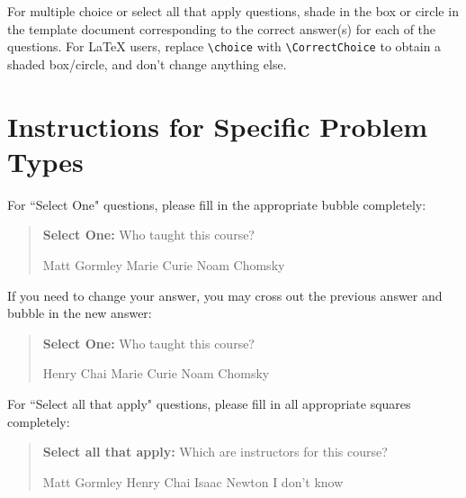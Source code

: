 \documentclass[11pt,addpoints,answers]{exam}
\newcommand{\blackcircle}{\tikz\draw[black,fill=black] (0,0) circle (1ex);}
\begin{document}

For multiple choice or select all that apply questions, shade in the box or circle in the template document corresponding to the correct answer(s) for each of the questions. For \LaTeX{} users, replace \lstinline{\choice} with \lstinline{\CorrectChoice} to obtain a shaded box/circle, and don't change anything else.\clearpage

\section*{Instructions for Specific Problem Types}

For ``Select One" questions, please fill in the appropriate bubble completely:

\begin{quote}
\textbf{Select One:} Who taught this course?
    \begin{checkboxes}
     \CorrectChoice Matt Gormley
     \choice Marie Curie
     \choice Noam Chomsky
    \end{checkboxes}
\end{quote}

If you need to change your answer, you may cross out the previous answer and bubble in the new answer:

\begin{quote}
\textbf{Select One:} Who taught this course?
    {
    \begin{checkboxes}
     \CorrectChoice Henry Chai 
     \choice Marie Curie \checkboxchar{\xcancel{\blackcircle}{}}
     \choice Noam Chomsky 
    \end{checkboxes}
    }
\end{quote}

For ``Select all that apply" questions, please fill in all appropriate squares completely:

\begin{quote}
\textbf{Select all that apply:} Which are instructors for this course?
    {%
    \checkboxchar{$\Box$} \checkedchar{$\blacksquare$} %
    \begin{checkboxes}
    \CorrectChoice Matt Gormley  
    \CorrectChoice Henry Chai
    \choice Isaac Newton
    \choice I don't know
    \end{checkboxes}
    }
\end{quote}
\end{document}
